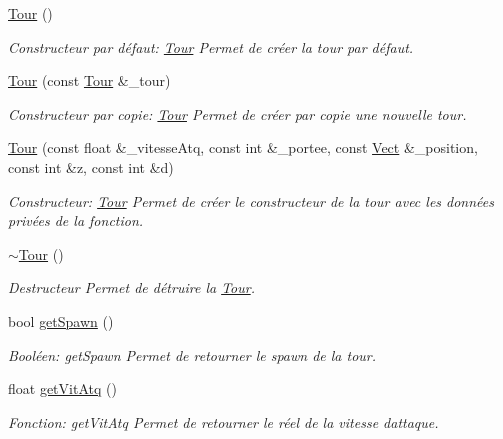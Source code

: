 \begin{DoxyCompactItemize}
\item 
\hyperlink{classTour_a85e0f0e2346d1e42a09a80c1cd6d19c4}{Tour} ()
\begin{DoxyCompactList}\small\item\em Constructeur par défaut\+: \hyperlink{classTour}{Tour} Permet de créer la tour par défaut. \end{DoxyCompactList}\item 
\hyperlink{classTour_a3e25a64c74446192ac71283e08db4e49}{Tour} (const \hyperlink{classTour}{Tour} \&\+\_\+tour)
\begin{DoxyCompactList}\small\item\em Constructeur par copie\+: \hyperlink{classTour}{Tour} Permet de créer par copie une nouvelle tour. \end{DoxyCompactList}\item 
\hyperlink{classTour_abb21d80605aacb220f1ab7ac92119ce4}{Tour} (const float \&\+\_\+vitesse\+Atq, const int \&\+\_\+portee, const \hyperlink{classVect}{Vect} \&\+\_\+position, const int \&z, const int \&d)
\begin{DoxyCompactList}\small\item\em Constructeur\+: \hyperlink{classTour}{Tour} Permet de créer le constructeur de la tour avec les données privées de la fonction. \end{DoxyCompactList}\item 
\mbox{\label{classTour_a6d692d4b1a687bf34f6b38828d86512e}} 
\hyperlink{classTour_a6d692d4b1a687bf34f6b38828d86512e}{$\sim$\+Tour} ()
\begin{DoxyCompactList}\small\item\em Destructeur Permet de détruire la \hyperlink{classTour}{Tour}. \end{DoxyCompactList}\item 
bool \hyperlink{classTour_ae71fadbf5144610f0cc6a0e0b78386bb}{get\+Spawn} ()
\begin{DoxyCompactList}\small\item\em Booléen\+: get\+Spawn Permet de retourner le spawn de la tour. \end{DoxyCompactList}\item 
float \hyperlink{classTour_a41fc157f749f571732100fa0daa1ad25}{get\+Vit\+Atq} ()
\begin{DoxyCompactList}\small\item\em Fonction\+: get\+Vit\+Atq Permet de retourner le réel de la vitesse d\textquotesingle{}attaque. \end{DoxyCompactList}\item 

\end{DoxyCompactItemize}
